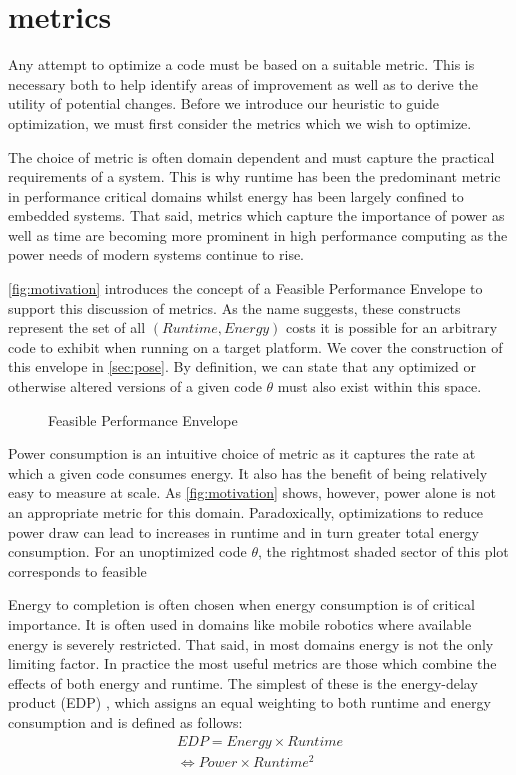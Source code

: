 \section{metrics}
\label{sec:metrics}
Any attempt to optimize a code must be based on a suitable metric.
This is necessary both to help identify areas of improvement as well as to derive the utility of potential changes.
Before we introduce our heuristic to guide optimization, we must first consider the metrics which we wish to optimize. 

The choice of metric is often domain dependent and must capture the practical requirements of a system.
This is why runtime has been the predominant metric in performance critical domains whilst energy has been largely confined to embedded systems.
That said, metrics which capture the importance of power as well as time are becoming more prominent in high performance computing as the power needs of modern systems continue to rise.

\autoref{fig:motivation} introduces the concept of a Feasible Performance Envelope to support this discussion of metrics.  As the name suggests, these constructs represent the set of all $(Runtime, Energy)$ costs it is possible for an arbitrary code to exhibit when running on a target platform. We cover the construction of this envelope in \ref{sec:pose}.
By definition, we can state that any optimized or otherwise altered versions of a given code $\theta$ must also exist within this space.

\begin{figure}
\centering

\caption{Feasible Performance Envelope}
\label{fig:motivation}
\end{figure}

Power consumption is an intuitive choice of metric as it captures the rate at which a given code consumes energy. It also has the benefit of being relatively easy to measure at scale. As \autoref{fig:motivation} shows, however, power alone is not an appropriate metric for this domain. Paradoxically, optimizations to reduce power draw can lead to increases in runtime and in turn greater total energy consumption. For an unoptimized code $\theta$, the rightmost shaded sector of this plot corresponds to feasible  

Energy to completion is often chosen when energy consumption is of critical importance. It is often used in domains like mobile robotics where available energy is severely restricted. That said, in most domains energy is not the only limiting factor. In practice the most useful metrics are those which combine the effects of both energy and runtime. The simplest of these is the energy-delay product (EDP) \cite{gonzales:1995aa}, which assigns an equal weighting to both runtime and energy consumption and is defined as follows:
\begin{align}
  EDP = Energy \times Runtime \nonumber \\
      \Leftrightarrow Power \times Runtime^{2} 
  \label{eq:edp}
\end{align}

